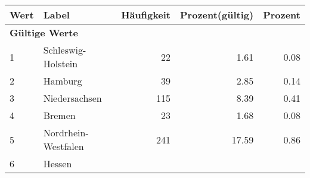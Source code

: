      \begin{longtable}{lXrrr}
     \toprule
     \textbf{Wert} & \textbf{Label} & \textbf{Häufigkeit} & \textbf{Prozent(gültig)} & \textbf{Prozent} \\
     \endhead
     \midrule
     \multicolumn{5}{l}{\textbf{Gültige Werte}}\\

     1 &
     \multicolumn{1}{X}{ Schleswig-Holstein   } &


       \num{22} &
       \num[round-mode=places,round-precision=2]{1,61} &
         \num[round-mode=places,round-precision=2]{0,08} \\

     2 &
     \multicolumn{1}{X}{ Hamburg   } &


       \num{39} &
       \num[round-mode=places,round-precision=2]{2,85} &
         \num[round-mode=places,round-precision=2]{0,14} \\

     3 &
     \multicolumn{1}{X}{ Niedersachsen   } &


       \num{115} &
       \num[round-mode=places,round-precision=2]{8,39} &
         \num[round-mode=places,round-precision=2]{0,41} \\

     4 &
     \multicolumn{1}{X}{ Bremen   } &


       \num{23} &
       \num[round-mode=places,round-precision=2]{1,68} &
         \num[round-mode=places,round-precision=2]{0,08} \\

     5 &
     \multicolumn{1}{X}{ Nordrhein-Westfalen   } &


       \num{241} &
       \num[round-mode=places,round-precision=2]{17,59} &
         \num[round-mode=places,round-precision=2]{0,86} \\

     6 &
     \multicolumn{1}{X}{ Hessen   } &



\end{longtable}
